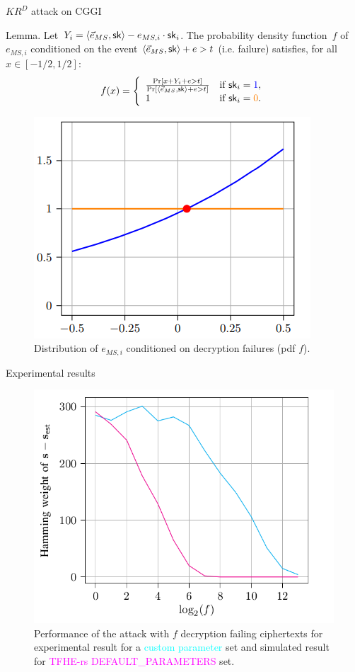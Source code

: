 \documentclass[handout]{beamer}
\begin{document}
	\begin{frame}{$KR^D$ attack on CGGI}

    {\small \vspace{-0.1cm}
		\begin{block}{Lemma.}\vspace{0.1cm}
			Let~$Y_i = \langle \vec{e}_{MS}, {\sf sk} \rangle - e_{MS, i} \cdot {\sf sk}_i$.
			The probability density function~$f$ of~$e_{MS,i}$ conditioned on the event $\langle \vec{e}_{MS}, {\sf sk} \rangle + e > t$ (i.e. failure) satisfies, for all~$x \in [-1/2,1/2]$: 
			\[
			f(x) = \left\{
			\begin{array}{ll}
				\frac{\Pr[x + Y_i + e > t]}{\Pr[ \langle \vec{e}_{MS}, {\sf sk} \rangle + e > t]}& \text{if } {\sf sk}_i=\textcolor{blue}{1}, \\
				1& \text{if } {\sf sk}_i = \textcolor{orange}{0}.
			\end{array}\right.\]
		\end{block}\vspace{-0.3cm}\pause
    }

        \begin{figure}[h]
            \centering
            \includegraphics[width=0.4\linewidth]{slope.png}
            \caption{Distribution of $e_{MS, i}$ conditioned on decryption failures (pdf $f$). }
        \end{figure}
	\end{frame}
 
	\begin{frame}{Experimental results}
		\begin{figure}
			\centering
			\includegraphics[width=0.7\linewidth]{exp}
			\caption{Performance of the attack with $f$ decryption failing ciphertexts for experimental result for a \textcolor{cyan}{custom parameter} set and simulated result for \textcolor{magenta}{TFHE-rs DEFAULT\_PARAMETERS} set.}
			\label{fig:tkrd}
		\end{figure}
	\end{frame}
 
\end{document}
